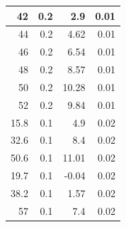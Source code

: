 \documentclass[12pt,a4paper]{article}
\begin{document}
\begin{table}[H]
\begin{center}
\begin{tabular}{|r|r|r|r|}
42 & 0.2 & 2.9 & 0.01 \\ \hline
44 & 0.2 & 4.62 & 0.01 \\ \hline
46 & 0.2 & 6.54 & 0.01 \\ \hline
48 & 0.2 & 8.57 & 0.01 \\ \hline
50 & 0.2 & 10.28 & 0.01 \\ \hline
52 & 0.2 & 9.84 & 0.01 \\ \hline
15.8 & 0.1 & 4.9 & 0.02 \\ \hline
32.6 & 0.1 & 8.4 & 0.02 \\ \hline
50.6 & 0.1 & 11.01 & 0.02 \\ \hline
19.7 & 0.1 & -0.04 & 0.02 \\ \hline
38.2 & 0.1 & 1.57 & 0.02 \\ \hline
57 & 0.1 & 7.4 & 0.02 \\ \hline
\end{tabular}
\end{center}
\label{tab: daten_n}
\end{table}
\end{document}
